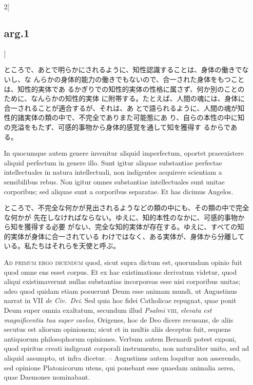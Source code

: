 \documentclass[paper=a4paper,fontsize=10pt,jafontsize=9pt,titlepage]{jlreq}
\begin{document}
\begin{paracol}{2}[\subsection{arg.1}]
\switchcolumn

ところで、あとで明らかにされるように、知性認識することは、身体の働きでないし、な
んらかの身体的能力の働きでもないので、合一された身体をもつことは、知性的実体であ
るかぎりでの知性的実体の性格に属さず、何か別のことのために、なんらかの知性的実体
に附帯する。たとえば、人間の魂には、身体に合一されることが適合するが、それは、あ
とで語られるように、人間の魂が知性的諸実体の類の中で、不完全でありまた可能態にあ
り、自らの本性の中に知の充溢をもたず、可感的事物から身体的感覚を通して知を獲得す
るからである。

\switchcolumn*

In quocumque autem genere invenitur aliquid imperfectum, oportet praeexistere
aliquid perfectum in genere illo. Sunt igitur aliquae substantiae perfectae
intellectuales in natura intellectuali, non indigentes acquirere scientiam a
sensibilibus rebus. Non igitur omnes substantiae intellectuales sunt unitae
corporibus; sed aliquae sunt a corporibus separatae. Et has dicimus Angelos.

\switchcolumn

ところで、不完全な何かが見出されるようなどの類の中にも、その類の中で完全な何かが
先在しなければならない。ゆえに、知的本性のなかに、可感的事物から知を獲得する必要
がない、完全な知的実体が存在する。ゆえに、すべての知的実体が身体に合一されている
わけではなく、ある実体が、身体から分離している。私たちはそれらを天使と呼ぶ。

\switchcolumn*[\subsection{ad.1}]

{\scshape Ad primum ergo dicendum} quod, sicut supra dictum est, quorundam
opinio fuit quod omne ens esset corpus. Et ex hac existimatione derivatum
videtur, quod aliqui existimaverunt nullas substantias incorporeas esse nisi
corporibus unitas; adeo quod quidam etiam posuerunt Deum esse animam mundi, ut
Augustinus narrat in VII {\itshape de Civ.~Dei}. Sed quia hoc fidei Catholicae
repugnat, quae ponit Deum super omnia exaltatum, secundum illud {\itshape
Psalmi} {\scshape viii}, {\itshape elevata est magnificentia tua super caelos},
Origenes, hoc de Deo dicere recusans, de aliis secutus est aliorum opinionem;
sicut et in multis aliis deceptus fuit, sequens antiquorum philosophorum
opiniones. Verbum autem Bernardi potest exponi, quod spiritus creati indigeant
corporali instrumento, non naturaliter unito, sed ad aliquid assumpto, ut infra
dicetur. -- Augustinus autem loquitur non asserendo, sed opinione Platonicorum
utens, qui ponebant esse quaedam animalia aerea, quae Daemones nominabant.


\end{paracol}
\end{document}
